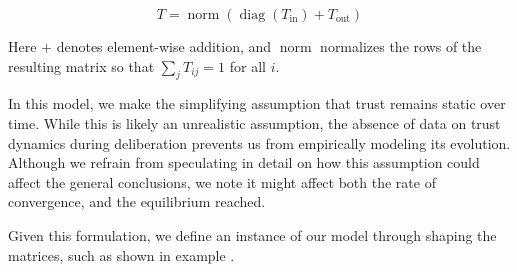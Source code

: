 \begin{equation}
	T = \operatorname{norm}\left(\operatorname{diag}(T_{\text{in}}) + T_{\text{out}}\right)
	\label{eq:final_trust}
\end{equation}

Here $+$ denotes element-wise addition, and $\operatorname{norm}$ normalizes the rows of the resulting matrix so that $\sum_j T_{ij} = 1$ for all $i$.


In this model, we make the simplifying assumption that trust remains static
over time. While this is likely an unrealistic assumption, the absence of data on
trust dynamics during deliberation prevents us from empirically modeling its
evolution. Although we refrain from speculating in detail on how this
assumption could affect the general conclusions, we note it might affect both
the rate of convergence, and the equilibrium reached.

Given this formulation, we define an instance of our model through shaping the
matrices, such as shown in example .

